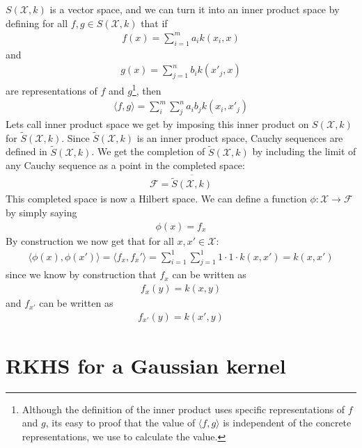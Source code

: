 \documentclass[12pt]{article}
\begin{document}
$S(\mathcal{X},k)$ is a vector space, and we can turn it into an inner product space by defining for all $f,g \in S(\mathcal{X},k)$ that if 
\begin{align}
f(x) = \sum_{i=1}^m a_ik(x_i,x)
\end{align}
and
\begin{align}
g(x) = \sum_{j=1}^n b_ik(x'_j,x)
\end{align}
are representations of $f$ and $g$\footnote{Although the definition of the inner product uses specific representations of $f$ and $g$, its easy to proof that the value of $\langle f,g \rangle$ is independent of the concrete representations, we use to calculate the value.}, then 
\begin{align}
\langle f, g \rangle = \sum_i^m \sum_j^n a_i b_j k(x_i,x'_j)
\end{align}
Lets call inner product space we get by imposing this inner product on $S(\mathcal{X},k)$ for $\tilde{S}(\mathcal{X},k)$. Since $\tilde{S}(\mathcal{X},k)$ is an inner product space, Cauchy sequences are defined in $\tilde{S}(\mathcal{X},k)$. We get the completion of $\tilde{S}(\mathcal{X},k)$ by including the limit of any Cauchy sequence as a point in the completed space:
\begin{align}
\mathcal{F} = \overline{\tilde{S}(\mathcal{X},k)}
\end{align}
This completed space is now a Hilbert space. We can define a function $\phi:\mathcal{X} \to \mathcal{F}$ by simply saying
\begin{align}
\phi(x) = f_x
\end{align}
By construction we now get that for all $x, x' \in \mathcal{X}$:
\begin{align}
\langle \phi(x), \phi(x') \rangle = \langle f_x, f_x' \rangle = \sum_{i=1}^1 \sum_{j=1}^1 1\cdot1\cdot k(x,x') = k(x,x') 
\end{align}
since we know by construction that $f_x$ can be written as
\begin{align}
f_x(y)=k(x,y)
\end{align}
and $f_{x'}$ can be written as
\begin{align}
f_{x'}(y)=k(x',y)
\end{align}

\pagebreak

\section{RKHS for a Gaussian kernel}
\end{document}
